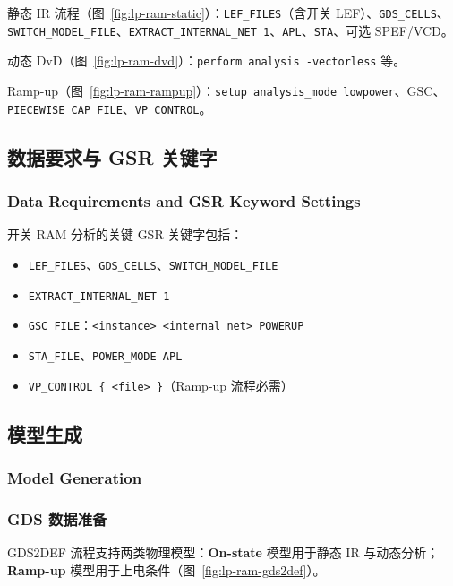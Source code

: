 静态 IR 流程（图~\ref{fig:lp-ram-static}）：\texttt{LEF\_FILES}（含开关 LEF）、\texttt{GDS\_CELLS}、\texttt{SWITCH\_MODEL\_FILE}、\texttt{EXTRACT\_INTERNAL\_NET 1}、\texttt{APL}、\texttt{STA}、可选 SPEF/VCD。


动态 DvD（图~\ref{fig:lp-ram-dvd}）：\texttt{perform analysis -vectorless} 等。

Ramp-up（图~\ref{fig:lp-ram-rampup}）：\texttt{setup analysis\_mode lowpower}、GSC、\texttt{PIECEWISE\_CAP\_FILE}、\texttt{VP\_CONTROL}。

\subsection{数据要求与 GSR 关键字}
\subsubsection*{Data Requirements and GSR Keyword Settings}

开关 RAM 分析的关键 GSR 关键字包括：
\begin{itemize}
  \item \texttt{LEF\_FILES}、\texttt{GDS\_CELLS}、\texttt{SWITCH\_MODEL\_FILE}
  \item \texttt{EXTRACT\_INTERNAL\_NET 1}
  \item \texttt{GSC\_FILE}：\texttt{<instance> <internal net> POWERUP}
  \item \texttt{STA\_FILE}、\texttt{POWER\_MODE APL}
  \item \texttt{VP\_CONTROL \{ <file> \}}（Ramp-up 流程必需）
\end{itemize}

\subsection{模型生成}
\subsubsection*{Model Generation}

\subsubsection{GDS 数据准备}
GDS2DEF 流程支持两类物理模型：\textbf{On-state} 模型用于静态 IR 与动态分析；\textbf{Ramp-up} 模型用于上电条件（图~\ref{fig:lp-ram-gds2def}）。



